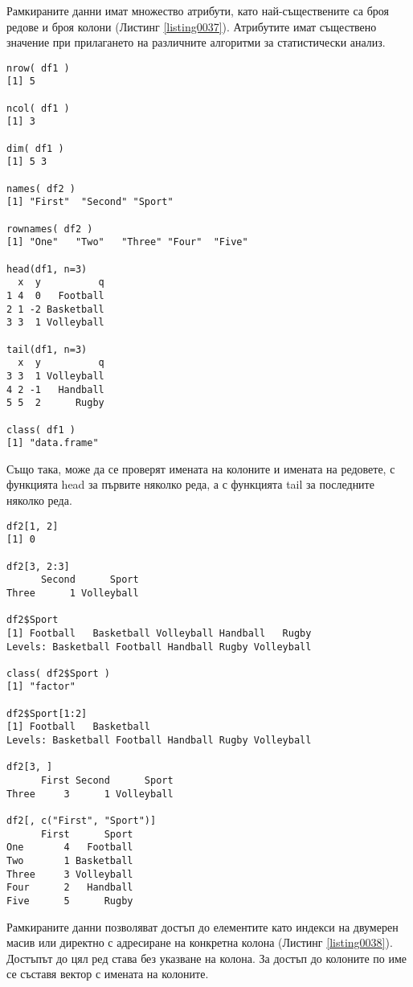 Рамкираните данни имат множество атрибути, като най-съществените са броя редове и броя колони (Листинг \ref{listing0037}). Атрибутите имат съществено значение при прилагането на различните алгоритми за статистически анализ.

\begin{lstlisting}[caption=Атрибути на рамкираните данни, label=listing0037]
nrow( df1 )
[1] 5

ncol( df1 )
[1] 3

dim( df1 )
[1] 5 3

names( df2 )
[1] "First"  "Second" "Sport"

rownames( df2 )
[1] "One"   "Two"   "Three" "Four"  "Five" 

head(df1, n=3)
  x  y          q
1 4  0   Football
2 1 -2 Basketball
3 3  1 Volleyball

tail(df1, n=3)
  x  y          q
3 3  1 Volleyball
4 2 -1   Handball
5 5  2      Rugby

class( df1 )
[1] "data.frame"
\end{lstlisting}

Също така, може да се проверят имената на колоните и имената на редовете, с функцията head за първите няколко реда, а с функцията tail за последните няколко реда.

\begin{lstlisting}[caption=Фактори в рамковите данни, label=listing0038]
df2[1, 2]
[1] 0

df2[3, 2:3]
      Second      Sport
Three      1 Volleyball

df2$Sport
[1] Football   Basketball Volleyball Handball   Rugby     
Levels: Basketball Football Handball Rugby Volleyball

class( df2$Sport )
[1] "factor"

df2$Sport[1:2]
[1] Football   Basketball
Levels: Basketball Football Handball Rugby Volleyball

df2[3, ]
      First Second      Sport
Three     3      1 Volleyball

df2[, c("First", "Sport")]
      First      Sport
One       4   Football
Two       1 Basketball
Three     3 Volleyball
Four      2   Handball
Five      5      Rugby
\end{lstlisting}

Рамкираните данни позволяват достъп до елементите като индекси на двумерен масив или директно с адресиране на конкретна колона (Листинг \ref{listing0038}). Достъпът до цял ред става без указване на колона. За достъп до колоните по име се съставя вектор с имената на колоните.

